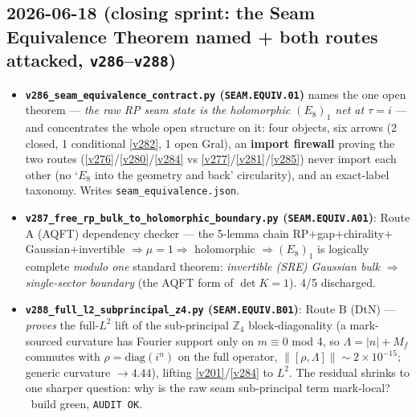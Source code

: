 \subsection*{2026-06-18 (closing sprint: the Seam Equivalence Theorem named + both routes attacked, \texttt{v286}--\texttt{v288})}
\begin{itemize}
\item \textbf{\texttt{v286\_seam\_equivalence\_contract.py} (\texttt{SEAM.EQUIV.01})} names the one open theorem
  --- \emph{the raw RP seam state is the holomorphic $(E_8)_1$ net at $\tau{=}i$} --- and concentrates the whole
  open structure on it: four objects, six arrows (2 closed, 1 conditional \vref{v282}, 1 open Gral), an
  \textbf{import firewall} proving the two routes (\vref{v276}/\vref{v280}/\vref{v284} vs
  \vref{v277}/\vref{v281}/\vref{v285}) never import each other (no `$E_8$ into the geometry and back'
  circularity), and an exact-label taxonomy. Writes \texttt{seam\_equivalence.json}.
\item \textbf{\texttt{v287\_free\_rp\_bulk\_to\_holomorphic\_boundary.py} (\texttt{SEAM.EQUIV.A01})}: Route A
  (AQFT) dependency checker --- the 5-lemma chain RP$+$gap$+$chirality$+$Gaussian$+$invertible
  $\Rightarrow\mu{=}1\Rightarrow$ holomorphic $\Rightarrow(E_8)_1$ is logically complete \emph{modulo one}
  standard theorem: \emph{invertible (SRE) Gaussian bulk $\Rightarrow$ single-sector boundary} (the AQFT form
  of $\det K{=}1$). 4/5 discharged.
\item \textbf{\texttt{v288\_full\_l2\_subprincipal\_z4.py} (\texttt{SEAM.EQUIV.B01})}: Route B (DtN) ---
  \emph{proves} the full-$L^2$ lift of the sub-principal $\mathbb{Z}_4$ block-diagonality (a mark-sourced
  curvature has Fourier support only on $m\equiv0$ mod 4, so $\Lambda=|n|+M_f$ commutes with
  $\rho=\mathrm{diag}(i^n)$ on the full operator, $\|[\rho,\Lambda]\|\sim2{\times}10^{-15}$; generic curvature
  $\to 4.44$), lifting \vref{v201}/\vref{v284} to $L^2$. The residual shrinks to one sharper question: why is the
  raw seam sub-principal term mark-local? \mE\ build green, \texttt{AUDIT OK}.
\end{itemize}

